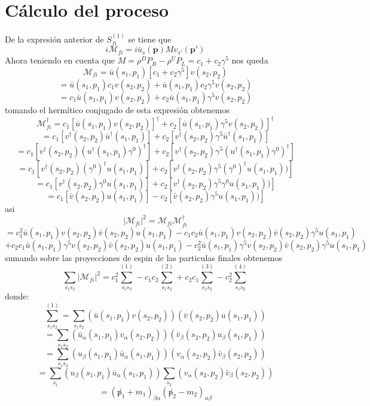 \section{Cálculo del proceso}
De la expresión anterior de $S^{(1)}_{fi}$ se tiene que
\begin{equation}
 i\mathcal{M}_{fi}=i\bar{u}_s(\mathbf{p})M v_{s'}(\mathbf{p'})
\end{equation}
Ahora teniendo en cuenta que $M= \rho^{D} P_R- \rho^{U} P_L=c_1+c_2\gamma^{5}$ nos queda
\[
 \mathcal{M}_{fi}=\bar{u}(s_1,p_1) [c_1+c_2\gamma^{5}] v(s_2,p_2)
\]
\[
 =\bar{u}(s_1,p_1) c_1v(s_2,p_2)+\bar{u}(s_1,p_1)c_2\gamma^{5}v(s_2,p_2)
\]
\[
  =c_1\bar{u}(s_1,p_1)v(s_2,p_2)+ c_2\bar{u}(s_1,p_1) \gamma^{5}v(s_2,p_2)
\]
tomando el hermítico conjugado de esta expresión obtenemos
\[
 \mathcal{M}_{fi}^{\dagger}=c_1[\bar{u}(s_1,p_1) v(s_2,p_2)]^{\dagger}+ c_2[\bar{u}(s_1,p_1) \gamma^{5} v(s_2,p_2)]^{\dagger}
\]
\[
 =c_1[v^{\dagger}(s_2,p_2)\bar{u}^{\dagger}(s_1,p_1)]+ c_2[v^{\dagger}(s_2,p_2) \gamma^{5}\bar{u}^{\dagger}(s_1,p_1)]
\]
\[
 =c_1[v^{\dagger}(s_2,p_2)(u^{\dagger}(s_1,p_1)\gamma^{0})^{\dagger}]+ c_2[v^{\dagger}(s_2,p_2) \gamma^{5}(u^{\dagger}(s_1,p_1)\gamma^{0})^{\dagger}]
\]
\[
 =c_1[v^{\dagger}(s_2,p_2)(\gamma^{0})^{\dagger}u(s_1,p_1)]+ c_2[v^{\dagger}(s_2,p_2) \gamma^{5}(\gamma^{0})^{\dagger}u(s_1,p_1))]
\]
\[
 =c_1[v^{\dagger}(s_2,p_2)\gamma^{0}u(s_1,p_1)]+ c_2[v^{\dagger}(s_2,p_2) \gamma^{5}\gamma^{0}u(s_1,p_1))]
\]
\[
 =c_1[\bar{v}(s_2,p_2)u(s_1,p_1)]- c_2[\bar{v}(s_2,p_2) \gamma^{5}u(s_1,p_1))]
\]
asi
\[
 |\mathcal{M}_{fi}|^{2}=\mathcal{M}_{fi}\mathcal{M}_{fi}^{\dagger}
\]
\[
 =c_1^{2}\bar{u}(s_1,p_1)v(s_2,p_2)\bar{v}(s_2,p_2)u(s_1,p_1)-c_1c_2\bar{u}(s_1,p_1)v(s_2,p_2)\bar{v}(s_2,p_2) \gamma^{5}u(s_1,p_1)
\]
\[
+c_2c_1\bar{u}(s_1,p_1) \gamma^{5}v(s_2,p_2)\bar{v}(s_2,p_2)u(s_1,p_1)-c_2^{2}\bar{u}(s_1,p_1) \gamma^{5}v(s_2,p_2)\bar{v}(s_2,p_2) \gamma^{5}u(s_1,p_1)
\]
sumando sobre las proyecciones de espin de las particulas finales obtenemos
\[
 \sum_{s_1s_2}|\mathcal{M}_{fi}|^{2}=c_1^{2}\sum_{s_1s_2}^{(1)}-c_1c_2\sum_{s_1s_2}^{(2)}+c_2c_1\sum_{s_1s_2}^{(3)}-c_2^{2}\sum_{s_1s_2}^{(4)}
\]
donde:
\[
 \sum_{s_1s_2}^{(1)}=\sum_{s_1s_2}(\bar{u}(s_1,p_1)v(s_2,p_2))(\bar{v}(s_2,p_2)u(s_1,p_1))
\]
\[
 =\sum_{s_1s_2}(\bar{u}_{\alpha}(s_1,p_1)v_{\alpha}(s_2,p_2))(\bar{v}_{\beta}(s_2,p_2)u_{\beta}(s_1,p_1))
\]
\[
  =\sum_{s_1s_2}(u_{\beta}(s_1,p_1)\bar{u}_{\alpha}(s_1,p_1))(v_{\alpha}(s_2,p_2)\bar{v}_{\beta}(s_2,p_2))
\]
\[
 =\sum_{s_1}(u_{\beta}(s_1,p_1)\bar{u}_{\alpha}(s_1,p_1))\sum_{s_2}(v_{\alpha}(s_2,p_2)\bar{v}_{\beta}(s_2,p_2)) 
\]
\[
 =(\not p_1+m_1)_{\beta\alpha}(\not p_2-m_2)_{\alpha\beta}
\]
